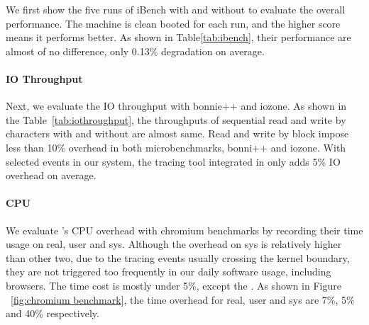 We first show the five runs of iBench with and without \xxx to evaluate the
overall performance. The machine is clean booted for each run, and the higher
score means it performs better. As shown in Table\ref{tab:ibench}, their
performance are almost of no difference, only 0.13\% degradation on average.

\paragraph{IO Throughput}

Next, we evaluate the IO throughput with bonnie++ and iozone. As shown in the
Table~\ref{tab:iothroughput}, the throughputs of sequential read and write
by characters with and without \xxx are almost same. Read and write by block
impose less than 10\% overhead in  both microbenchmarks, bonni++ and iozone.
With selected events in our system, the tracing tool integrated in \xxx
only adds 5\% IO overhead on average.


\paragraph{CPU}

We evaluate \xxx's CPU overhead with chromium benchmarks by recording their
time usage on real, user and sys. Although the overhead on sys is relatively
higher than other two, due to the tracing events usually crossing the
kernel boundary, they are not triggered too frequently in our daily software
usage, including browsers. The time cost is mostly under 5\%, except the
. As shown in Figure ~\ref{fig:chromium
benchmark}, the time overhead for real, user and sys are 7\%, 5\% and 40\%
respectively.

